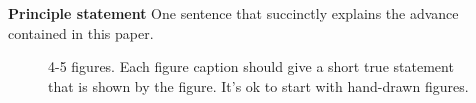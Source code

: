 \documentclass{article}
\begin{document}
 

\textbf{Principle statement} One sentence that succinctly explains the advance contained in this paper.


\begin{figure}
    \caption{4-5 figures. Each figure caption should give a short true statement that is shown by the figure. It's ok to start with hand-drawn figures.}
\end{figure}
\end{document}
